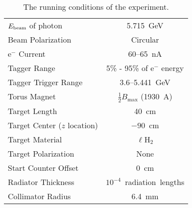 \begin{table}[htpb]
\begin{center}

\begin{minipage}{0.8\textwidth}

\caption{\label{tab:runconditions}The running conditions of the  experiment.}
\begin{center}
\begin{tabular}{lc}

\hline \hline

$E_{\mathrm{beam}}$ of photon & 5.715~GeV \\
Beam Polarization & Circular \\
e$^-$ Current & 60--65~nA \\
Tagger Range & 5\% - 95\% of e$^-$ energy \\
Tagger Trigger Range & 3.6--5.441~GeV \\
Torus Magnet & $\frac{1}{2} B_\mathrm{max}$ (1930~A) \\
Target Length & 40~cm \\
Target Center ($z$ location) & $-90$~cm \\
Target Material & $\ell$H$_2$ \\
Target Polarization & None \\
Start Counter Offset & 0~cm \\
Radiator Thickness & $10^{-4}$~radiation~lengths \\
Collimator Radius & 6.4~mm \\

\hline \hline

\end{tabular}
\end{center}

\end{minipage}

\end{center}
\end{table}
